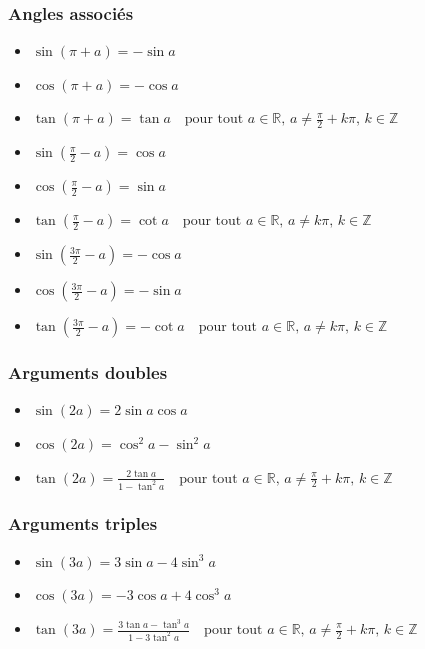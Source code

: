 \documentclass[12]{article}%
\theoremstyle{plain}
\theoremstyle{definition}
\theoremstyle{remark}
\begin{document}
\subsubsection{Angles associés}
\begin{itemize}
	\item \( \boxed{\sin(\pi + a) = -\sin a} \)
	\item \( \boxed{\cos(\pi + a) = -\cos a} \)
	\item \( \boxed{\tan(\pi + a) = \tan a} \quad \text{pour tout } a \in \mathbb{R}, \, a \neq \frac{\pi}{2} + k\pi, \, k \in \mathbb{Z} \)
\end{itemize}
\begin{itemize}
	\item \( \boxed{\sin\left(\frac{\pi}{2} - a\right) = \cos a} \)
	\item \( \boxed{\cos\left(\frac{\pi}{2} - a\right) = \sin a} \)
	\item \( \boxed{\tan\left(\frac{\pi}{2} - a\right) = \cot a} \quad \text{pour tout } a \in \mathbb{R}, \, a \neq k\pi, \, k \in \mathbb{Z} \)
\end{itemize}

\begin{itemize}
	\item \( \boxed{\sin\left(\frac{3\pi}{2} - a\right) = -\cos a} \)
	\item \( \boxed{\cos\left(\frac{3\pi}{2} - a\right) = -\sin a} \)
	\item \( \boxed{\tan\left(\frac{3\pi}{2} - a\right) = -\cot a} \quad \text{pour tout } a \in \mathbb{R}, \, a \neq k\pi, \, k \in \mathbb{Z} \)
\end{itemize}

\subsubsection{Arguments doubles}
\begin{itemize}
	\item \( \boxed{\sin(2a) = 2 \sin a \cos a} \)
	\item \( \boxed{\cos(2a) = \cos^2 a - \sin^2 a} \)
	\item \( \boxed{\tan(2a) = \frac{2 \tan a}{1 - \tan^2 a}} \quad \text{pour tout } a \in \mathbb{R}, \, a \neq \frac{\pi}{2} + k\pi, \, k \in \mathbb{Z} \)
\end{itemize}

\subsubsection{Arguments triples}
\begin{itemize}
	\item \( \boxed{\sin(3a) = 3 \sin a - 4 \sin^3 a} \)
	\item \( \boxed{\cos(3a) = -3 \cos a + 4 \cos^3 a} \)
	\item \( \boxed{\tan(3a) = \frac{3 \tan a - \tan^3 a}{1 - 3 \tan^2 a}} \quad \text{pour tout } a \in \mathbb{R}, \, a \neq \frac{\pi}{2} + k\pi, \, k \in \mathbb{Z} \)
\end{itemize}
\end{document}

